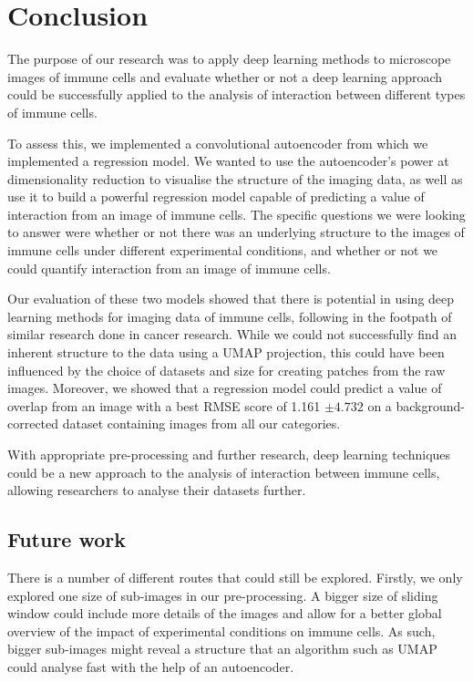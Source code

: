 \chapter{Conclusion}    

The purpose of our research was to apply deep learning methods to microscope images of immune cells and evaluate whether or not a deep learning approach could be successfully applied to the analysis of interaction between different types of immune cells. 

To assess this, we implemented a convolutional autoencoder from which we implemented a regression model. We wanted to use the autoencoder's power at dimensionality reduction to visualise the structure of the imaging data, as well as use it to build a powerful regression model capable of predicting a value of interaction from an image of immune cells. The specific questions we were looking to answer were whether or not there was an underlying structure to the images of immune cells under different experimental conditions, and whether or not we could quantify interaction from an image of immune cells.

Our evaluation of these two models showed that there is potential in using deep learning methods for imaging data of immune cells, following in the footpath of similar research done in cancer research. While we could not successfully find an inherent structure to the data using a UMAP projection, this could have been influenced by the choice of datasets and size for creating patches from the raw images. Moreover, we showed that a regression model could predict a value of overlap from an image with a best RMSE score of 1.161 $\pm 4.732$ on a background-corrected dataset containing images from all our categories. 

With appropriate pre-processing and further research, deep learning techniques could be a new approach to the analysis of interaction between immune cells, allowing researchers to analyse their datasets further.

\section{Future work}

There is a number of different routes that could still be explored. Firstly, we only explored one size of sub-images in our pre-processing. A bigger size of sliding window could include more details of the images and allow for a better global overview of the impact of experimental conditions on immune cells. As such, bigger sub-images might reveal a structure that an algorithm such as UMAP could analyse fast with the help of an autoencoder.

